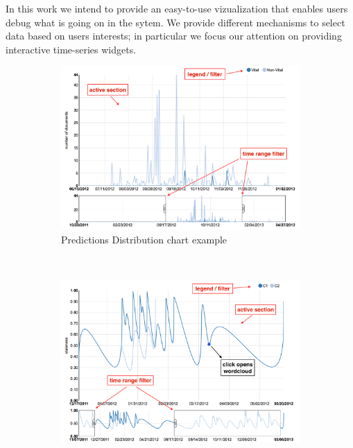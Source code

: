 \documentclass{article}
\begin{document}
In this work we intend to provide an easy-to-use vizualization that enables users debug what is going on in the sytem. We provide different mechanisms to select data based on users interests; in particular we focus our attention on providing interactive time-series widgets.

\begin{figure}[tb]
        \centering
        \begin{subfigure}[b]{0.4\textwidth}
			\includegraphics[width=\textwidth]{fig/vitalDistribution.png}
			\caption{Predictions Distribution chart example}
			\label{vitalEvol}
        \end{subfigure}
        \\
        \begin{subfigure}[b]{0.4\textwidth}
            \includegraphics[width=\textwidth]{fig/stalenessDistribution.png}

\end{subfigure}
\end{figure}
\end{document}
